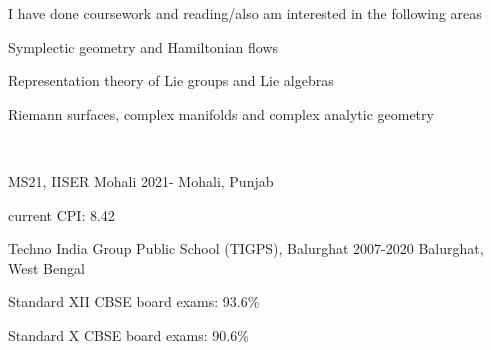 \documentclass{LoLaTeXcv}
\begin{document}
I have done coursework and reading/also am interested in the following areas


\begin{lltxItemize}
	\item Symplectic geometry and Hamiltonian flows
	\item Representation theory of Lie groups and Lie algebras
	\item Riemann surfaces, complex manifolds and complex analytic geometry
\end{lltxItemize}





\

\begin{lltxJob}{
		MS21, IISER Mohali}{
		2021-}{
		Mohali, Punjab}
	\item current CPI: 8.42
\end{lltxJob}


\begin{lltxJob}
	{
		Techno India Group Public School (TIGPS), Balurghat}{
		2007-2020}{
		Balurghat, West Bengal}
	\item Standard XII CBSE board exams: 93.6\%
	\item Standard X CBSE board exams: 90.6\%
\end{lltxJob}

\end{document}
